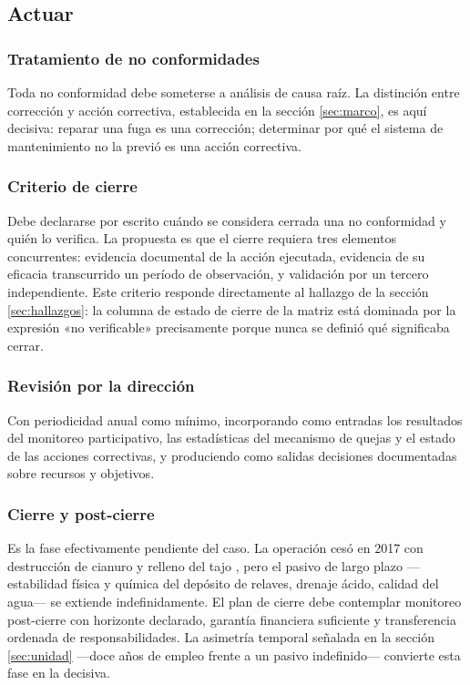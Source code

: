 \subsection{Actuar}
\label{sec:actuar}

\subsubsection{Tratamiento de no conformidades}

Toda no conformidad debe someterse a análisis de causa raíz. La distinción entre
corrección y acción correctiva, establecida en la sección \ref{sec:marco}, es aquí
decisiva: reparar una fuga es una corrección; determinar por qué el sistema de
mantenimiento no la previó es una acción correctiva.

\subsubsection{Criterio de cierre}

Debe declararse por escrito cuándo se considera cerrada una no conformidad y quién
lo verifica. La propuesta es que el cierre requiera tres elementos concurrentes:
evidencia documental de la acción ejecutada, evidencia de su eficacia transcurrido
un período de observación, y validación por un tercero independiente. Este
criterio responde directamente al hallazgo de la sección \ref{sec:hallazgos}: la
columna de estado de cierre de la matriz está dominada por la expresión «no
verificable» precisamente porque nunca se definió qué significaba cerrar.

\subsubsection{Revisión por la dirección}

Con periodicidad anual como mínimo, incorporando como entradas los resultados del
monitoreo participativo, las estadísticas del mecanismo de quejas y el estado de
las acciones correctivas, y produciendo como salidas decisiones documentadas sobre
recursos y objetivos.

\subsubsection{Cierre y post-cierre}

Es la fase efectivamente pendiente del caso. La operación cesó en 2017 con
destrucción de cianuro y relleno del tajo \parencite{goldcorp2023marlin}, pero el
pasivo de largo plazo —estabilidad física y química del depósito de relaves,
drenaje ácido, calidad del agua— se extiende indefinidamente. El plan de cierre
debe contemplar monitoreo post-cierre con horizonte declarado, garantía financiera
suficiente y transferencia ordenada de responsabilidades. La asimetría temporal
señalada en la sección \ref{sec:unidad} —doce años de empleo frente a un pasivo
indefinido— convierte esta fase en la decisiva.

